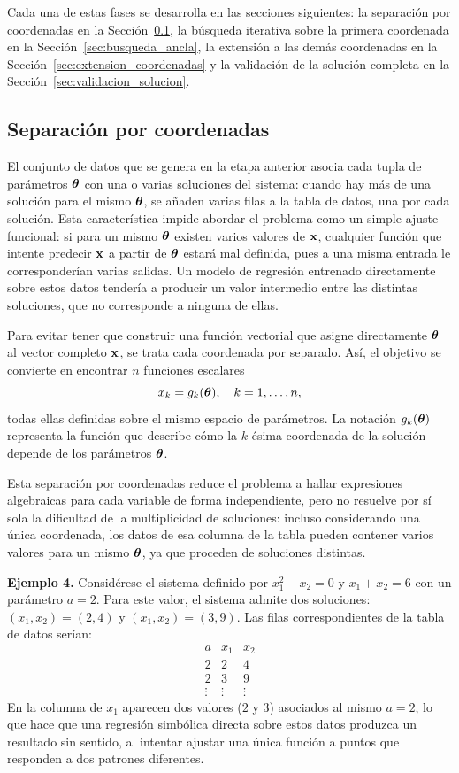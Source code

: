 Cada una de estas fases se desarrolla en las secciones siguientes: la separación por coordenadas en la Sección~\ref{sec:desacoplamiento}, la búsqueda iterativa sobre la primera coordenada en la Sección~\ref{sec:busqueda_ancla}, la extensión a las demás coordenadas en la Sección~\ref{sec:extension_coordenadas} y la validación de la solución completa en la Sección~\ref{sec:validacion_solucion}.

\subsection{Separación por coordenadas}
\label{sec:desacoplamiento}

El conjunto de datos que se genera en la etapa anterior asocia cada tupla de parámetros \(\boldsymbol{\theta}\) con una o varias soluciones del sistema: cuando hay más de una solución para el mismo \(\boldsymbol{\theta}\), se añaden varias filas a la tabla de datos, una por cada solución. Esta característica impide abordar el problema como un simple ajuste funcional: si para un mismo \(\boldsymbol{\theta}\) existen varios valores de
\(\mathbf{x}\), cualquier función que intente predecir \(\mathbf{x}\) a partir
de \(\boldsymbol{\theta}\) estará mal definida, pues a una misma entrada le corresponderían varias salidas. Un modelo de regresión entrenado directamente sobre estos datos tendería a producir un valor intermedio entre las distintas soluciones, que no corresponde a ninguna de ellas.

Para evitar tener que construir una función vectorial que asigne directamente \(\boldsymbol{\theta}\) al vector completo \(\mathbf{x}\), se trata cada coordenada por separado. Así, el objetivo se convierte en encontrar
\(n\) funciones escalares
\[
x_k = g_k(\boldsymbol{\theta}), \quad k = 1, \dots, n,
\]
todas ellas definidas sobre el mismo espacio de parámetros. La notación \(g_k(\boldsymbol{\theta})\) representa la función que describe cómo la
\(k\)-ésima coordenada de la solución depende de los parámetros
\(\boldsymbol{\theta}\).

Esta separación por coordenadas reduce el problema a hallar expresiones algebraicas para cada variable de forma independiente, pero no resuelve por sí sola la dificultad de la multiplicidad de soluciones: incluso considerando una única coordenada, los datos de esa columna de la tabla pueden contener varios valores para un mismo
\(\boldsymbol{\theta}\), ya que proceden de soluciones distintas.

\noindent\textbf{Ejemplo 4.} Considérese el sistema definido por
\(x_1^2 - x_2 = 0\) y \(x_1 + x_2 = 6\) con un parámetro
\(a = 2\). Para este valor, el sistema admite dos soluciones:
\((x_1, x_2) = (2, 4)\) y \((x_1, x_2) = (3, 9)\). Las filas
correspondientes de la tabla de datos serían:
\[
\begin{array}{c|c|c}
a & x_1 & x_2 \\
\hline 2 & 2 & 4 \\
2 & 3 & 9 \\
\vdots & \vdots & \vdots
\end{array}
\]
En la columna de \(x_1\) aparecen dos valores (\(2\) y \(3\)) asociados al mismo \(a = 2\), lo que hace que una regresión simbólica directa sobre estos datos produzca un resultado sin sentido, al intentar ajustar una única función a puntos que responden a dos patrones diferentes.

